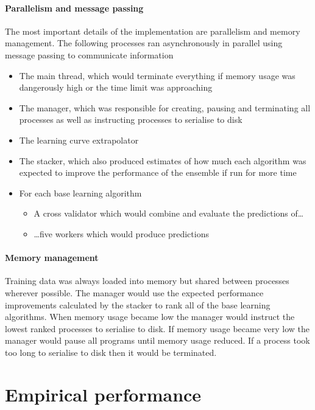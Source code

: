 \documentclass{article} %
\begin{document}
\paragraph{Parallelism and message passing}

The most important details of the implementation are parallelism and memory management.
The following processes ran asynchronously in parallel using message passing to communicate information
\begin{itemize}
  \item The main thread, which would terminate everything if memory usage was dangerously high or the time limit was approaching
  \item The manager, which was responsible for creating, pausing and terminating all processes as well as instructing processes to serialise to disk
  \item The learning curve extrapolator
  \item The stacker, which also produced estimates of how much each algorithm was expected to improve the performance of the ensemble if run for more time
  \item For each base learning algorithm
  \begin{itemize}
    \item A cross validator which would combine and evaluate the predictions of\dots
    \item \dots five workers which would produce predictions
  \end{itemize}
\end{itemize}

\paragraph{Memory management}

Training data was always loaded into memory but shared between processes wherever possible.
The manager would use the expected performance improvements calculated by the stacker to rank all of the base learning algorithms.
When memory usage became low the manager would instruct the lowest ranked processes to serialise to disk.
If memory usage became very low the manager would pause all programs until memory usage reduced.
If a process took too long to serialise to disk then it would be terminated.

\section{Empirical performance}
\end{document}

